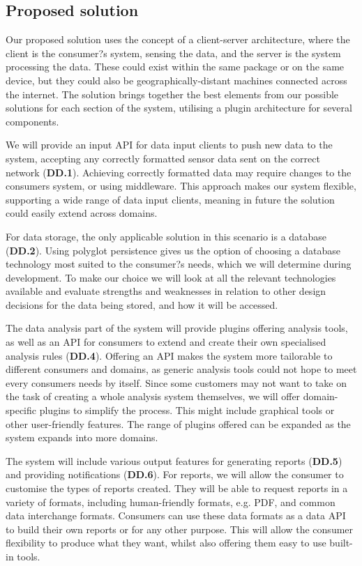 \documentclass[10pt,a4paper]{article}
\begin{document}
\subsection{Proposed solution}
Our proposed solution uses the concept of a client-server architecture, where
the client is the consumer?s system, sensing the data, and the server is the
system processing the data. These could exist within the same package or on the
same device, but they could also be geographically-distant machines connected
across the internet. The solution brings together the best elements from our
possible solutions for each section of the system, utilising a plugin
architecture for several components.

We will provide an input API for data input clients to push new data to the
system, accepting any correctly formatted sensor data sent on the correct
network (\textbf{DD.1}). Achieving correctly formatted data may require changes
to the consumers system, or using middleware. This approach makes our system
flexible, supporting a wide range of data input clients, meaning in future the
solution could easily extend across domains.

For data storage, the only applicable solution in this scenario is a database
(\textbf{DD.2}). Using polyglot persistence gives us the option of choosing a
database technology most suited to the consumer?s needs, which we will determine
during development. To make our choice we will look at all the relevant
technologies available and evaluate strengths and weaknesses in relation to
other design decisions for the data being stored, and how it will be accessed.

The data analysis part of the system will provide plugins offering analysis
tools, as well as an API for consumers to extend and create their own
specialised analysis rules (\textbf{DD.4}). Offering an API makes the system
more tailorable to different consumers and domains, as generic analysis tools
could not hope to meet every consumers needs by itself. Since some customers may
not want to take on the task of creating a whole analysis system themselves, we
will offer domain-specific plugins to simplify the process. This might include
graphical tools or other user-friendly features. The range of plugins offered
can be expanded as the system expands into more domains.

The system will include various output features for generating reports
(\textbf{DD.5}) and providing notifications (\textbf{DD.6}). For reports, we
will allow the consumer to customise the types of reports created. They will be
able to request reports in a variety of formats, including human-friendly
formats, e.g. PDF, and common data interchange formats. Consumers can use these
data formats as a data API to build their own reports or for any other purpose.
This will allow the consumer flexibility to produce what they want, whilst also
offering them easy to use built-in tools.
\end{document}
